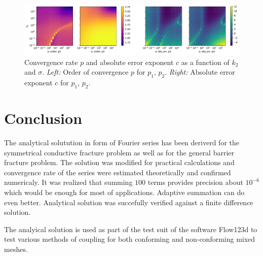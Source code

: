 \documentclass[a4paper,10pt]{article}
\begin{document}
\begin{figure}
  \label{fig:barrier_rate}
  \centering
  \includegraphics[width=\textwidth]{./barrier_conv_rate.pdf}
  \caption{Convergence rate $p$ and absolute error exponent $c$ as a function of $k_2$ and $\sigma$. 
  {\it Left:} Order of convergence $p$ for $p_1$, $p_2$.
  {\it Right:} Absolute error exponent $c$ for $p_1$, $p_2$.}
\end{figure}


\section{Conclusion}
\label{sec:conclusion}
The analytical solutution in form of Fourier series has been deriverd for the symmetrical conductive fracture problem as well as for 
the general barrier fracture problem. The solution was modified for practical calculations and convergence rate of the series were estimated theoretically and 
confirmed numericaly. It was realized that summing $100$ terms provides precision about $10^{-6}        $ which would be enough for most of applications.
Adaptive summation can do even better. Analytical solution was succefully verified against a finite difference solution.  

The analyical solution is used as part of the test suit of the software Flow123d \cite{flow123d} to test various methods of coupling for both conforming 
and non-conforming mixed meshes.



  
 
\end{document}
